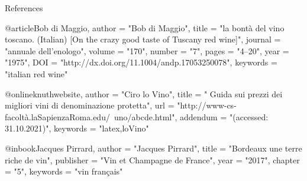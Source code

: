 \documentclass[10pt]{beamer}
\begin{document}
\begin{frame}[allowframebreaks]{References}

  \printbibliography
@article{Bob di Maggio,
    author = "Bob di Maggio",
    title = "{la bontà del vino toscano}. ({Italian})
    [{On} the crazy good taste of Tuscany red wine]",
    journal = "annuale dell'enologo",
    volume = "170",
    number = "7",
    pages = "4--20",
    year = "1975",
    DOI = "http://dx.doi.org/11.1004/andp.17053250078",
    keywords = "italian red wine"
}


@online{knuthwebsite,
    author = "Ciro lo Vino",
    title = " Guida sui prezzi dei migliori vini di denominazione protetta",
    url  = "http://www-cs-facoltà.laSapienzaRoma.edu/~uno/abcde.html",
    addendum = "(accessed: 31.10.2021)",
    keywords = "latex,loVino"
}

@inbook{Jacques Pirrard,
    author = "Jacques Pirrard",
    title = "Bordeaux une terre riche de vin",
    publisher = "Vin et Champagne de France",
    year = "2017",
    chapter = "5",
    keywords  = "vin français"
}
\end{frame}
\end{document}
